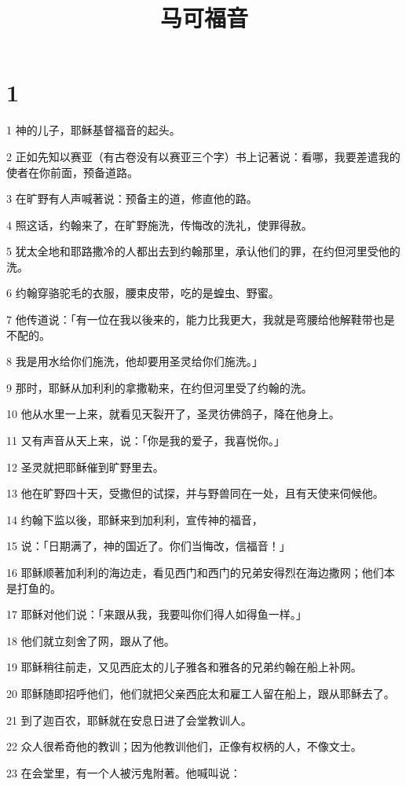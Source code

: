 

\title{马可福音}


\chapter{1}

\par 1 神的儿子，耶稣基督福音的起头。
\par 2 正如先知以赛亚（有古卷没有以赛亚三个字）书上记著说：看哪，我要差遣我的使者在你前面，预备道路。
\par 3 在旷野有人声喊著说：预备主的道，修直他的路。
\par 4 照这话，约翰来了，在旷野施洗，传悔改的洗礼，使罪得赦。
\par 5 犹太全地和耶路撒冷的人都出去到约翰那里，承认他们的罪，在约但河里受他的洗。
\par 6 约翰穿骆驼毛的衣服，腰束皮带，吃的是蝗虫、野蜜。
\par 7 他传道说：「有一位在我以後来的，能力比我更大，我就是弯腰给他解鞋带也是不配的。
\par 8 我是用水给你们施洗，他却要用圣灵给你们施洗。」
\par 9 那时，耶稣从加利利的拿撒勒来，在约但河里受了约翰的洗。
\par 10 他从水里一上来，就看见天裂开了，圣灵彷佛鸽子，降在他身上。
\par 11 又有声音从天上来，说：「你是我的爱子，我喜悦你。」
\par 12 圣灵就把耶稣催到旷野里去。
\par 13 他在旷野四十天，受撒但的试探，并与野兽同在一处，且有天使来伺候他。
\par 14 约翰下监以後，耶稣来到加利利，宣传神的福音，
\par 15 说：「日期满了，神的国近了。你们当悔改，信福音！」
\par 16 耶稣顺著加利利的海边走，看见西门和西门的兄弟安得烈在海边撒网；他们本是打鱼的。
\par 17 耶稣对他们说：「来跟从我，我要叫你们得人如得鱼一样。」
\par 18 他们就立刻舍了网，跟从了他。
\par 19 耶稣稍往前走，又见西庇太的儿子雅各和雅各的兄弟约翰在船上补网。
\par 20 耶稣随即招呼他们，他们就把父亲西庇太和雇工人留在船上，跟从耶稣去了。
\par 21 到了迦百农，耶稣就在安息日进了会堂教训人。
\par 22 众人很希奇他的教训；因为他教训他们，正像有权柄的人，不像文士。
\par 23 在会堂里，有一个人被污鬼附著。他喊叫说：
